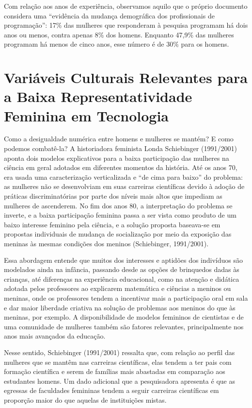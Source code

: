 Com relação aos anos de experiência, observamos aquilo que o próprio documento considera uma “evidência da mudança demográfica dos profissionais de programação”: 17\% das mulheres que responderam à pesquisa programam há dois anos ou menos, contra apenas 8\% dos homens. Enquanto 47,9\% das mulheres programam há menos de cinco anos, esse número é de 30\% para os homens. 

\section*{Variáveis Culturais Relevantes para a Baixa Representatividade Feminina em Tecnologia}

Como a desigualdade numérica entre homens e mulheres se mantém? E como podemos combatê-la? A historiadora feminista Londa Schiebinger (1991/2001) aponta dois modelos explicativos para a baixa participação das mulheres na ciência em geral adotados em diferentes momentos da história. Até os anos 70, era usada uma caracterização verticalizada e “de cima para baixo” do problema: as mulheres não se desenvolviam em suas carreiras científicas devido à adoção de práticas discriminatórias por parte dos níveis mais altos que impediam as mulheres de ascenderem. No fim dos anos 80, a interpretação do problema se inverte, e a baixa participação feminina passa a ser vista como produto de um baixo interesse feminino pela ciência, e a solução proposta baseava-se em propostas individuais de mudança de socialização por meio da exposição das meninas às mesmas condições dos meninos (Schiebinger, 1991/2001).

Essa abordagem entende que muitos dos interesses e aptidões dos indivíduos são modelados ainda na infância, passando desde as opções de brinquedos dadas às crianças, até diferenças na experiência educacional, como na atenção e didática adotada pelos professores ao explicarem matemática e ciências a meninos ou meninas, onde os professores tendem a incentivar mais a participação oral em sala e dar maior liberdade criativa na solução de problemas aos meninos do que às meninas, por exemplo. A disponibilidade de modelos femininos de cientistas e de uma comunidade de mulheres também são fatores relevantes, principalmente nos anos mais avançados da educação.

Nesse sentido, Schiebinger (1991/2001) ressalta que, com relação ao perfil das mulheres que se mantêm nas carreiras científicas, elas tendem a ter pais com formação científica e serem de famílias mais abastadas em comparação aos estudantes homens. Um dado adicional que a pesquisadora apresenta é que as egressas de faculdades femininas tendem a seguir carreiras científicas em proporção maior do que aquelas de instituições mistas. 

